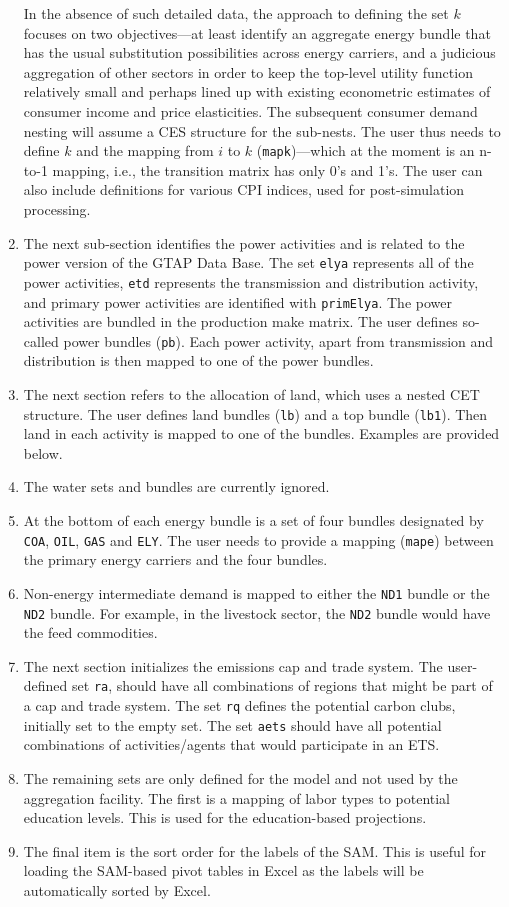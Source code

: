 \begin{enumerate}
In the absence of such detailed data, the approach to defining the set $k$ focuses
on two objectives---at least identify an aggregate energy bundle that has
the usual substitution possibilities across energy carriers, and a judicious
aggregation of other sectors in order to keep the top-level utility function
relatively small and perhaps lined up with existing econometric estimates of
consumer income and price elasticities. The subsequent consumer demand nesting
will assume a CES structure for the sub-nests. The user thus needs to
define $k$ and the mapping from $i$ to $k$ (\texttt{mapk})---which at the moment
is an n-to-1 mapping, i.e., the transition matrix has only 0's and 1's.
The user can also include definitions for various CPI indices, used for
post-simulation processing.
\item The next sub-section identifies the power activities and is related
to the power version of the GTAP Data Base. The set \texttt{elya} represents
all of the power activities, \texttt{etd} represents the transmission
and distribution activity, and primary power activities are identified with
\texttt{primElya}. The power activities are bundled in the production make matrix.
The user defines so-called power bundles (\texttt{pb}). Each power activity, apart from
transmission and distribution is then mapped to one of the power bundles.
\item The next section refers to the allocation of land, which uses a nested
CET structure. The user defines land bundles (\texttt{lb}) and a top bundle (\texttt{lb1}).
Then land in each activity is mapped to one of the bundles. Examples are provided below.
\item The water sets and bundles are currently ignored.
\item At the bottom of each energy bundle is a set of four bundles
designated by \texttt{COA}, \texttt{OIL}, \texttt{GAS} and \texttt{ELY}. The
user needs to provide a mapping (\texttt{mape}) between the
primary energy carriers and the four bundles.
\item Non-energy intermediate demand is mapped to either the
\texttt{ND1} bundle or the \texttt{ND2} bundle. For example, in the
livestock sector, the \texttt{ND2} bundle would have the feed commodities.
\item The next section initializes the emissions cap and trade system. The
user-defined set \texttt{ra}, should have all combinations of regions
that might be part of a cap and trade system. The set \texttt{rq} defines
the potential carbon clubs, initially set to the empty set. The set
\texttt{aets} should have all potential combinations of activities/agents that would
participate in an ETS.
\item The remaining sets are only defined for the model and not used
by the aggregation facility. The first is a mapping of labor types
to potential education levels. This is used for the education-based
projections.
\item The final item is the sort order for the labels of the SAM. This
is useful for loading the SAM-based pivot tables in Excel as the labels
will be automatically sorted by Excel.
\end{enumerate}

